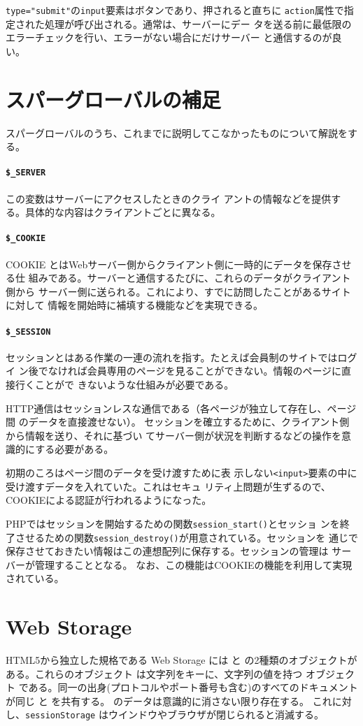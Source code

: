 \Verb+type="submit"+の\texttt{input}要素はボタンであり、押されると直ちに
\texttt{action}属性で指定された処理が呼び出される。通常は、サーバーにデー
タを送る前に最低限のエラーチェックを行い、エラーがない場合にだけサーバー
と通信するのが良い。

\section{スパーグローバルの補足}
スパーグローバルのうち、これまでに説明してこなかったものについて解説をする。
\paragraph{\texttt{\$\_SERVER}}
この変数はサーバーにアクセスしたときのクライ
アントの情報などを提供する。具体的な内容はクライアントごとに異なる。

\paragraph{\texttt{\$\_COOKIE}}
COOKIE とはWebサーバー側からクライアント側に一時的にデータを保存させる仕
組みである。サーバーと通信するたびに、これらのデータがクライアント側から
サーバー側に送られる。これにより、すでに訪問したことがあるサイトに対して
情報を開始時に補填する機能などを実現できる。
\paragraph{\texttt{\$\_SESSION}}
セッションとはある作業の一連の流れを指す。たとえば会員制のサイトではログイ
ン後でなければ会員専用のページを見ることができない。情報のページに直接行くことがで
きないような仕組みが必要である。

HTTP通信はセッションレスな通信である（各ページが独立して存在し、ページ間
のデータを直接渡せない）。
セッションを確立するために、クライアント側から情報を送り、それに基づい
てサーバー側が状況を判断するなどの操作を意識的にする必要がある。

初期のころはページ間のデータを受け渡すために表
示しない\texttt{<input>}要素の中に受け渡すデータを入れていた。これはセキュ
リティ上問題が生ずるので、COOKIEによる認証が行われるようになった。

PHPではセッションを開始するための関数\texttt{session\_start()}とセッショ
ンを終了させるための関数\texttt{session\_destroy()}が用意されている。セッションを
通じで保存させておきたい情報はこの連想配列に保存する。セッションの管理は
サーバーが管理することとなる。
なお、この機能はCOOKIEの機能を利用して実現されている。
\section{Web Storage}
HTML5から独立した規格である Web Storage には  と
 の2種類のオブジェクトがある。これらのオブジェクト
は文字列をキーに、文字列の値を持つ  オブジェクト
である。同一の出身(プロトコルやポート番号も含む)のすべてのドキュメント
が同じ  と  を共有する。
 のデータは意識的に消さない限り存在する。
%
これに対し、\texttt{sessionStorage} はウインドウやブラウザが閉じられると消滅する。

